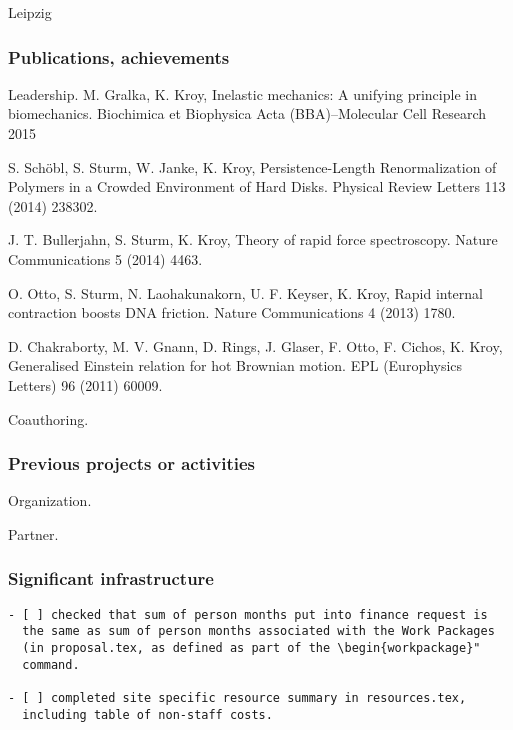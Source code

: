 \begin{sitedescription}{Leipzig}
\subsubsection*{Publications, achievements}

\begin{compactenum}
\item Leadership.
M. Gralka, K. Kroy, Inelastic mechanics: A unifying principle in biomechanics. 
Biochimica et Biophysica Acta (BBA)--Molecular Cell Research 2015

S. Schöbl, S. Sturm, W. Janke, K. Kroy, Persistence-Length Renormalization of Polymers in a Crowded Environment of Hard Disks.
Physical Review Letters 113 (2014) 238302.

J. T. Bullerjahn, S. Sturm, K. Kroy, Theory of rapid force spectroscopy. Nature Communications 5 (2014) 4463.

O. Otto, S. Sturm, N. Laohakunakorn, U. F. Keyser, K. Kroy, Rapid internal contraction boosts DNA friction.
Nature Communications 4 (2013) 1780.

D. Chakraborty, M. V. Gnann, D. Rings, J. Glaser, F. Otto, F. Cichos, K. Kroy, 
Generalised Einstein relation for hot Brownian motion. EPL (Europhysics Letters) 96 (2011) 60009.

\item Coauthoring.
\end{compactenum}

\subsubsection*{Previous projects or activities}

\begin{compactenum}
\item Organization.
\item Partner.
\end{compactenum}

\subsubsection*{Significant infrastructure}


\end{sitedescription}

\begin{draft}
\vspace{1cm}

\begin{verbatim}
- [ ] checked that sum of person months put into finance request is
  the same as sum of person months associated with the Work Packages
  (in proposal.tex, as defined as part of the \begin{workpackage}"
  command.
  
- [ ] completed site specific resource summary in resources.tex,
  including table of non-staff costs.

\end{verbatim}
\end{draft}

